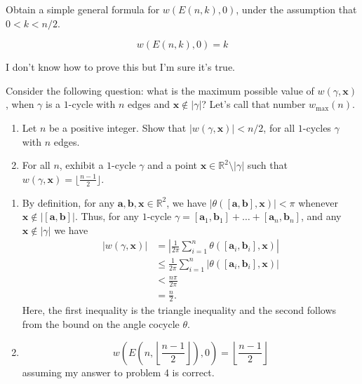 \documentclass[12 pt, letterpaper]{hmcpset}
\begin{document}
\pagebreak

\begin{problem}[4.]
	Obtain a simple general formula for $w(E(n, k), 0)$, under the assumption that $0 < k < n / 2$.
\end{problem}

\begin{solution}
	\[
		\boxed{
			w(E(n, k), 0) = k
		}
	\]

	I don't know how to prove this but I'm sure it's true.
\end{solution}	

\pagebreak

\begin{problem}[5.]
	Consider the following question: what is the maximum possible value of $w(\gamma, \mathbf{x})$, when $\gamma$ is a $1$-cycle with $n$ edges and $\mathbf{x} \notin \lvert \gamma \rvert$? Let's call that number $w_{\text{max}}(n)$.
	\begin{enumerate}
		\item Let $n$ be a positive integer. Show that $\lvert w(\gamma, \mathbf{x}) \rvert < n / 2$, for all $1$-cycles $\gamma$ with $n$ edges.
		\item For all $n$, exhibit a $1$-cycle $\gamma$ and a point $\mathbf{x} \in \mathbb{R}^{2} \setminus \lvert \gamma \rvert$ such that $w(\gamma, \mathbf{x}) = \lfloor \frac{n - 1}{2} \rfloor$.
	\end{enumerate}
\end{problem}

\begin{solution}
	\begin{enumerate}
		\item By definition, for any $\mathbf{a}, \mathbf{b}, \mathbf{x} \in \mathbb{R}^{2}$, we have $\lvert \theta([\mathbf{a}, \mathbf{b}], \mathbf{x}) \rvert < \pi$ whenever $\mathbf{x} \notin \lvert [\mathbf{a}, \mathbf{b}] \rvert$. Thus, for any $1$-cycle $\gamma = [\mathbf{a}_{1}, \mathbf{b}_{1}] + \dots + [\mathbf{a}_{n}, \mathbf{b}_{n}]$, and any $\mathbf{x} \notin \lvert \gamma \rvert$ we have
			 \begin{align*}
				 \lvert w(\gamma, \mathbf{x}) \rvert & = \left \lvert \frac{1}{2 \pi} \sum_{i = 1}^{n} \theta([\mathbf{a}_{i}, \mathbf{b}_{i}], \mathbf{x}) \right \rvert \\
								     & \le \frac{1}{2 \pi} \sum_{i = 1}^{n} \lvert \theta([\mathbf{a}_{i}, \mathbf{b}_{i}], \mathbf{x}) \rvert \\
								     & < \frac{n \pi}{2 \pi} \\
								     & = \frac{n}{2}.
			\end{align*}
			Here, the first inequality is the triangle inequality and the second follows from the bound on the angle cocycle $\theta$.
		\item
			\[
				\boxed{
					w \left ( E \left ( n, \left \lfloor \frac{n - 1}{2} \right \rfloor \right ), 0 \right ) = \left \lfloor \frac{n - 1}{2} \right \rfloor
			}
			\]
			assuming my answer to problem 4 is correct.
	\end{enumerate}
\end{solution}
\end{document}
